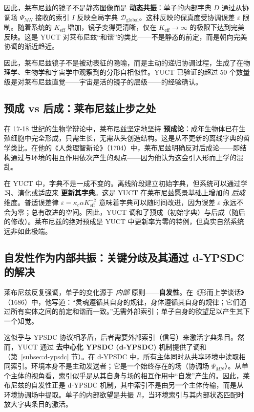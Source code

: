 \documentclass[12pt,a4paper]{article}
\begin{document}
	因此，莱布尼兹的镜子不是静态图像而是 \textbf{动态共振}：单子的内部字典 \(D\) 通过从协调场 \(\Psi_{MN}\) 接收的索引 \(I\) 反映全局字典 \(\mathcal{D}_{\text{global}}\)。这种反映的保真度受协调误差 \(\varepsilon\) 限制。随着系统的 \(K_{\mathrm{eff}}\) 增加，镜子变得更清晰，仅在 \(K_{\mathrm{eff}} \to \infty\) 的极限下达到完美反映。这是 YUCT 对莱布尼兹“和谐”的类比——不是静态的前定，而是朝向完美协调的渐近趋近。
	
	因此，莱布尼兹镜子不是被动表征的隐喻，而是主动的递归协调过程，生成了在物理学、生物学和宇宙学中观察到的分形自相似性。YUCT 已验证的超过 50 个数量级是对莱布尼兹直觉——宇宙是活的镜子的层级——的经验确认。
	
	\subsection{预成 vs 后成：莱布尼兹止步之处}
	
	在 17-18 世纪的生物学辩论中，莱布尼兹坚定地坚持 \textbf{预成论}：成年生物体已在生殖细胞中完全形成，只需生长，无需从头创造结构。这是从不更新的离线字典的哲学类比。在他的《人类理智新论》（1704）中，莱布尼兹明确反对后成论——即结构通过与环境的相互作用依次产生的观点——因为他认为这会引入形而上学的混乱。
	
	在 YUCT 中，字典不是一成不变的。离线阶段建立初始字典，但系统可以通过学习、演化或适应来 \textbf{更新其字典}。这是 YUCT 在莱布尼兹愿景基础上增加的 \emph{后成} 维度。普适误差律 \(\varepsilon = \kappa_c \alpha K_{\mathrm{eff}}^{-\beta}\) 意味着字典可以随时间改进，因为误差 \(\varepsilon\) 永远不会为零；总有改进的空间。因此，YUCT 调和了预成（初始字典）与后成（随后的修改）。莱布尼兹的绝对预成是 YUCT 中更新率为零的特例，但真实自然系统远非如此极端。
	
	\subsection{自发性作为内部共振：关键分歧及其通过 d‑YPSDC 的解决}
	
	莱布尼兹反复强调，单子的变化源于 \emph{内部} 原则——\textbf{自发性}。在《形而上学谈话》（1686）中，他写道：“灵魂遵循其自身的规律，身体遵循其自身的规律；它们通过所有实体之间的前定和谐而一致。”无需外部索引；单子自身的欲望足以产生其下一个知觉。
	
	这似乎与 YPSDC 协议相矛盾，后者需要外部索引（信号）来激活字典条目。然而，YUCT 通过 \textbf{去中心化 YPSDC (d‑YPSDC)} 机制提供了调和（第~\ref{subsec:d-ypsdc} 节）。在 d‑YPSDC 中，所有主体同时从共享环境中读取相同索引。环境本身不是主动发送者；它是一个始终存在的场（协调场 \(\Psi_{MN}\)）。从单个主体的视角看，索引似乎是从其自身与场的相互作用中“自发”产生的。因此，莱布尼兹的自发性正是 d‑YPSDC 机制，其中索引不是由另一个主体传输，而是从环境协调场中提取。单子的内部欲望是共振 \(R\)，当环境索引与其内部状态匹配时放大字典条目的激活。
	
\end{document}
